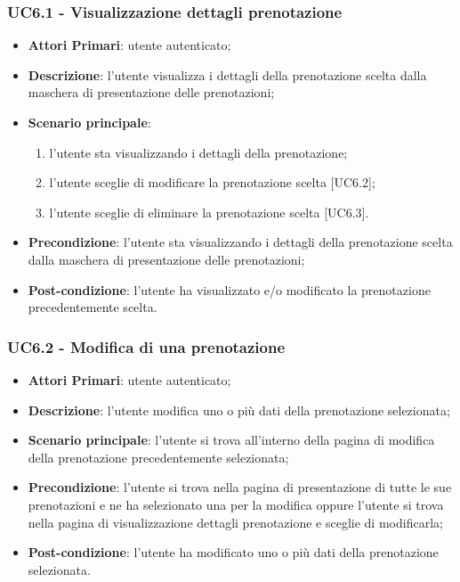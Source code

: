  \subsubsection{UC6.1 - Visualizzazione dettagli prenotazione}
\begin{itemize}
	\item \textbf{Attori Primari}: utente autenticato;
	\item \textbf{Descrizione}: l'utente visualizza i dettagli della prenotazione scelta dalla maschera di presentazione delle prenotazioni;
	\item \textbf{Scenario principale}:
	\begin{enumerate}[label=\alph*.]
		\item l'utente sta visualizzando i dettagli della prenotazione;
		\item l'utente sceglie di modificare la prenotazione scelta [UC6.2];
		\item l'utente sceglie di eliminare la prenotazione scelta [UC6.3].
	\end{enumerate}
	\item \textbf{Precondizione}: l'utente sta visualizzando i dettagli della prenotazione scelta dalla maschera di presentazione delle prenotazioni;
	\item \textbf{Post-condizione}: l'utente ha visualizzato e/o modificato la prenotazione precedentemente scelta.
\end{itemize}

\subsubsection{UC6.2 - Modifica di una prenotazione}
\begin{itemize}
	\item \textbf{Attori Primari}: utente autenticato;
	\item \textbf{Descrizione}: l'utente modifica uno o più dati della prenotazione selezionata;
	\item \textbf{Scenario principale}: l'utente si trova all'interno della pagina di modifica della prenotazione precedentemente selezionata;
	\item \textbf{Precondizione}: l'utente si trova nella pagina di presentazione di tutte le sue prenotazioni e ne ha selezionato una per la modifica oppure l'utente si trova nella pagina di visualizzazione dettagli prenotazione e sceglie di modificarla;
	\item \textbf{Post-condizione}: l'utente ha modificato uno o più dati della prenotazione selezionata.
\end{itemize}

